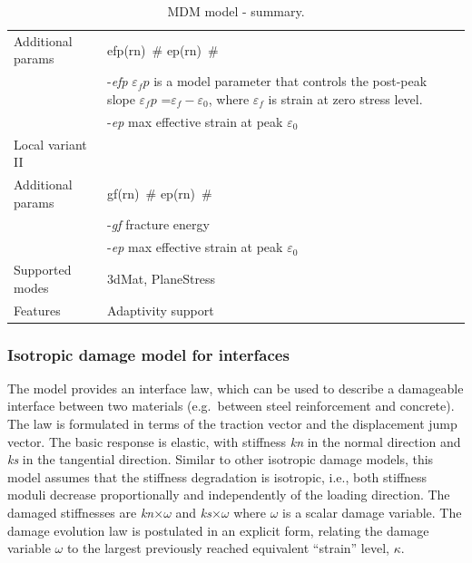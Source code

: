 \documentclass[a4paper]{article}
\newcommand{\elemparam}[2]{{{#1\tiny (#2)}~\#}}
\newcommand{\param}[1]{{\it #1}}
\begin{document}
\begin{table}[!htb]
\begin{tabular}{|l|p{9cm}|}
Additional params &\elemparam{efp}{rn} \elemparam{ep}{rn}\\
& -\param{efp} $\varepsilon_fp$ is a model parameter that controls
the post-peak slope $\varepsilon_fp$ =$\varepsilon_f-\varepsilon_0$,
where $\varepsilon_f$ is strain at zero stress level.\\
& -\param{ep} max effective strain at peak $\varepsilon_0$\\
\hline
Local variant II&\\
Additional params &\elemparam{gf}{rn} \elemparam{ep}{rn}\\
& -\param{gf} fracture energy\\
& -\param{ep} max effective strain at peak $\varepsilon_0$\\
\hline
Supported modes& 3dMat, PlaneStress\\
Features & Adaptivity support\\
\hline
\end{tabular}
\caption{MDM model - summary.}
\label{mdm_table}
\end{table}

\clearpage
\subsubsection{Isotropic damage model for interfaces}
\label{sec:idmfi}

The model provides an interface law, which can be used to describe a damageable interface between two materials (e.g.\ between steel reinforcement and concrete). The law is formulated in terms of the traction vector and the displacement jump vector. The basic response is elastic, with stiffness \param{kn} in 
the normal direction and \param{ks} in the tangential direction.
Similar to other isotropic damage models, this model assumes that the stiffness degradation is isotropic, i.e., both stiffness moduli decrease proportionally and independently of the loading 
direction. The damaged stiffnesses are \param{kn}$\times\omega$ and \param{ks}$\times\omega$ where $\omega$ is a scalar damage variable.
The damage evolution law is postulated in an explicit form, relating
the damage variable $\omega$ to the largest previously reached 
equivalent ``strain'' level, $\kappa$.
\end{document}
